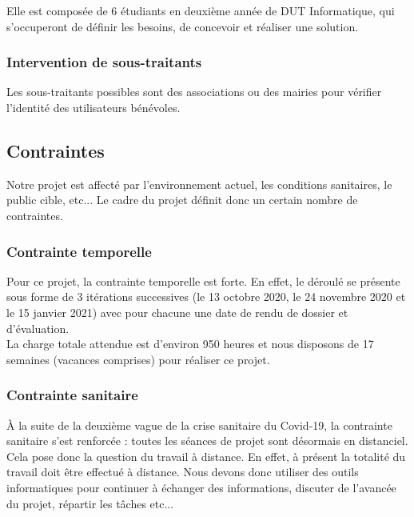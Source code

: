 \documentclass[a4paper,11pt]{article}
\begin{document}
Elle est composée de 6 étudiants en deuxième année de DUT Informatique, qui s’occuperont de définir les
besoins, de concevoir et réaliser une solution.\\

\subsubsection{Intervention de sous-traitants}

Les sous-traitants possibles sont des associations ou des mairies pour vérifier l’identité des utilisateurs
bénévoles.\\


\subsection{Contraintes}

Notre projet est affecté par l’environnement actuel, les conditions sanitaires, le public cible, etc...
Le cadre du projet définit donc un certain nombre de contraintes.

\subsubsection{Contrainte temporelle}

Pour ce projet, la contrainte temporelle est forte. En effet, le déroulé se présente sous forme de
3 itérations successives (le 13 octobre 2020, le 24 novembre 2020 et le 15 janvier 2021) avec pour
chacune une date de rendu de dossier et d’évaluation.\\

La charge totale attendue est d’environ 950 heures et nous disposons de 17 semaines (vacances
comprises) pour réaliser ce projet.\\

\subsubsection{Contrainte sanitaire}

À la suite de la deuxième vague de la crise sanitaire du Covid-19, la contrainte sanitaire s'est renforcée : toutes les séances de projet sont désormais en distanciel.\\

Cela pose donc la question du travail à distance. En effet, à présent la totalité du travail doit être effectué à distance. Nous devons donc utiliser des outils informatiques pour continuer à échanger des
informations, discuter de l’avancée du projet, répartir les tâches etc...\\
\end{document}
